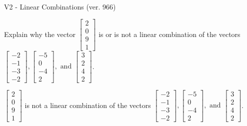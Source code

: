\begin{exercise}
  \begin{exerciseTitle}V2 - Linear Combinations (ver. 966)\end{exerciseTitle}
  \begin{exerciseStatement}
    Explain why the vector \(\left[\begin{array}{c}
2 \\
0 \\
9 \\
1
\end{array}\right]\)  is or is not a linear 
	combination of the vectors \(\left[\begin{array}{c}
-2 \\
-1 \\
-3 \\
-2
\end{array}\right] , \left[\begin{array}{c}
-5 \\
0 \\
-4 \\
2
\end{array}\right] , \text{ and } \left[\begin{array}{c}
3 \\
2 \\
4 \\
2
\end{array}\right]\).
	


  \end{exerciseStatement}
  \begin{exerciseAnswer}
   \(\left[\begin{array}{c}
2 \\
0 \\
9 \\
1
\end{array}\right]\) 
  	 is not  
	a linear combination of the vectors \(\left[\begin{array}{c}
-2 \\
-1 \\
-3 \\
-2
\end{array}\right] , \left[\begin{array}{c}
-5 \\
0 \\
-4 \\
2
\end{array}\right] , \text{ and } \left[\begin{array}{c}
3 \\
2 \\
4 \\
2
\end{array}\right]\).

	
  


  \end{exerciseAnswer}
\end{exercise}